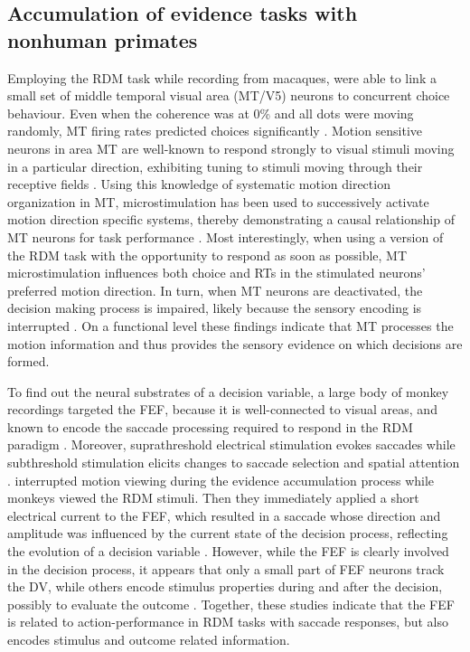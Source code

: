 \subsection{Accumulation of evidence tasks with nonhuman primates}
Employing the RDM task while recording from macaques, \textcite{Britten1992} were able to link a small set of middle temporal visual area (MT/V5) neurons to concurrent choice behaviour. Even when the coherence was at 0\% and all dots were moving randomly, MT firing rates predicted choices significantly \parencite{Britten1996}. Motion sensitive neurons in area MT are well-known to respond strongly to visual stimuli moving in a particular direction, exhibiting tuning to stimuli moving through their receptive fields \parencite{Baker1981,VanEssen1981,Zeki1980,Zeki1974}. Using this knowledge of systematic motion direction organization in MT, microstimulation has been used to successively activate motion direction specific systems, thereby demonstrating a causal relationship of MT neurons for task performance \parencite{Ditterich2003,Salzman1990,Salzman1992}. Most interestingly, when using a version of the RDM task with the opportunity to respond as soon as possible, MT microstimulation influences both choice and RTs in the stimulated neurons’ preferred motion direction. In turn, when MT neurons are deactivated, the decision making process is impaired, likely because the sensory encoding is interrupted \parencite{Katz2016}. On a functional level these findings indicate that MT processes the motion information and thus provides the sensory evidence on which decisions are formed.

To find out the neural substrates of a decision variable, a large body of monkey recordings targeted the FEF, because it is well-connected to visual areas, and known to encode the saccade processing required to respond in the RDM paradigm \parencite{Felleman1991,Hanes1996,Schall1995,Schall1995a,Thompson1996,VanEssen1992}. Moreover, suprathreshold electrical stimulation evokes saccades while subthreshold stimulation elicits changes to saccade selection and spatial attention \parencite{Burman1997,Moore2001,Moore2003,Robinson1969}. \textcite{Gold2000} interrupted motion viewing during the evidence accumulation process while monkeys viewed the RDM stimuli. Then they immediately applied a short electrical current to the FEF, which resulted in a saccade whose direction and amplitude was influenced by the current state of the decision process, reflecting the evolution of a decision variable \parencite{Gold2000,Gold2003}. However, while the FEF is clearly involved in the decision process, it appears that only a small part of FEF neurons track the DV, while others encode stimulus properties during and after the decision, possibly to evaluate the outcome \parencite{Ding2012}. Together, these studies indicate that the FEF is related to action-performance in RDM tasks with saccade responses, but also encodes stimulus and outcome related information.

